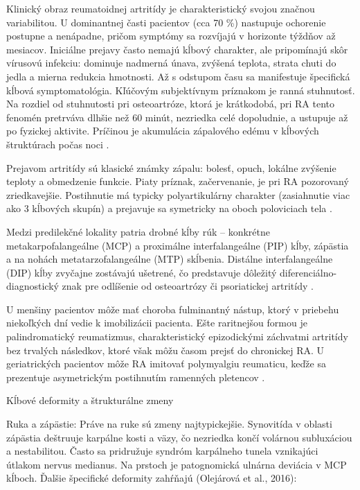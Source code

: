 Klinický obraz reumatoidnej artritídy je charakteristický svojou značnou variabilitou. U dominantnej časti pacientov (cca 70 \%) nastupuje ochorenie postupne a nenápadne, pričom symptómy sa rozvíjajú v horizonte týždňov až mesiacov. Iniciálne prejavy často nemajú kĺbový charakter, ale pripomínajú skôr vírusovú infekciu: dominuje nadmerná únava, zvýšená teplota, strata chuti do jedla a mierna redukcia hmotnosti. Až s odstupom času sa manifestuje špecifická kĺbová symptomatológia. Kľúčovým subjektívnym príznakom je ranná stuhnutosť. Na rozdiel od stuhnutosti pri osteoartróze, ktorá je krátkodobá, pri RA tento fenomén pretrváva dlhšie než 60 minút, nezriedka celé dopoludnie, a ustupuje až po fyzickej aktivite. Príčinou je akumulácia zápalového edému v kĺbových štruktúrach počas noci \parencite{Nemec2023}. 

Prejavom artritídy sú klasické známky zápalu: bolesť, opuch, lokálne zvýšenie teploty a obmedzenie funkcie. Piaty príznak, začervenanie, je pri RA pozorovaný zriedkavejšie. Postihnutie má typicky polyartikulárny charakter (zasiahnutie viac ako 3 kĺbových skupín) a prejavuje sa symetricky na oboch poloviciach tela \parencite{Nemec2023}. 

Medzi predilekčné lokality patria drobné kĺby rúk – konkrétne metakarpofalangeálne (MCP) a proximálne interfalangeálne (PIP) kĺby, zápästia a na nohách metatarzofalangeálne (MTP) skĺbenia. Distálne interfalangeálne (DIP) kĺby zvyčajne zostávajú ušetrené, čo predstavuje dôležitý diferenciálno-diagnostický znak pre odlíšenie od osteoartrózy či psoriatickej artritídy \parencite{Nemec2023, Rovensky2001}. 

U menšiny pacientov môže mať choroba fulminantný nástup, ktorý v priebehu niekoľkých dní vedie k imobilizácii pacienta. Ešte raritnejšou formou je palindromatický reumatizmus, charakteristický epizodickými záchvatmi artritídy bez trvalých následkov, ktoré však môžu časom prejsť do chronickej RA. U geriatrických pacientov môže RA imitovať polymyalgiu reumaticu, keďže sa prezentuje asymetrickým postihnutím ramenných pletencov \parencite{Nemec2023}. 

\vspace{0.5em}
Kĺbové deformity a štrukturálne zmeny


Ruka a zápästie: Práve na ruke sú zmeny najtypickejšie. Synovitída v oblasti zápästia deštruuje karpálne kosti a väzy, čo nezriedka končí volárnou subluxáciou a nestabilitou. Často sa pridružuje syndróm karpálneho tunela vznikajúci útlakom nervus medianus. Na prstoch je patognomická ulnárna deviácia v MCP kĺboch. Ďalšie špecifické deformity zahŕňajú (Olejárová et al., 2016): 

